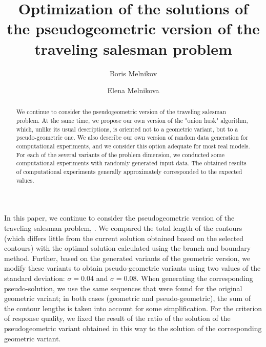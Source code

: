 \documentclass[12pt]{llncs}
\begin{document}
\fi

\title{Optimization of the solutions of the pseudogeometric version of the traveling salesman problem}
%
%
\author{%
Boris Melnikov
\and
Elena Melnikova
}
%
%
%

\maketitle              %

\begin{abstract}
We continue to consider the pseudogeometric version of the traveling salesman problem. 
At the same time, we propose our own version of the "onion husk" algorithm, which, unlike its usual descriptions, is oriented not to a geometric variant, but to a pseudo-geometric one.
We also describe our own version of random data generation for computational experiments, and we consider this option adequate for most real models.
For each of the several variants of the problem dimension, we conducted some computational experiments with randomly generated input data. 
The obtained results of computational experiments generally approximately corresponded to the expected values.
\end{abstract}

In this paper, 
we continue to consider the pseudogeometric version 
of the traveling salesman problem, 
\cite{gu-pu,KIO-2021,KIO-2022,Vasil-2022-1,Vasil-2022-2,SOI-2013}.
We compared the total length of the contours (which differs little from the current solution obtained based on the selected contours) with the optimal solution calculated using the branch and boundary method.
Further, based on the generated variants of the geometric version, we modify these variants to obtain pseudo-geometric variants using two values
of the standard deviation: $\sigma=0.04$ and $\sigma=0.08$.
When generating the corresponding pseudo-solution, we use the same sequences that were found for the original geometric variant;
in both cases (geometric and pseudo-geometric), the sum of the contour lengths is taken into account for some simplification.
For the criterion of response quality, we fixed the result of the ratio of the solution of the pseudogeometric variant obtained in this way to the solution of the corresponding geometric variant.
\end{document}
